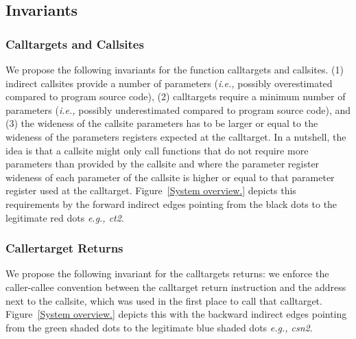 \subsection{Invariants}
\label{Invariants for Targets and Callsites}

\subsubsection{Calltargets and Callsites}
We propose the following invariants for the function calltargets and callsites.
(1) indirect callsites provide a number of parameters (\textit{i.e.,} possibly overestimated compared to program source code), 
(2) calltargets require a minimum number of parameters (\textit{i.e.,} possibly underestimated compared to program source code), and
(3) the wideness of the callsite parameters has to be larger or equal to the wideness of the parameters registers expected at the calltarget.
In a nutshell, the idea is that a callsite might only call functions that do not require more parameters than provided by the callsite and
where the parameter register wideness of each parameter of the callsite is higher or equal to that parameter register used at the calltarget.
Figure~\ref{System overview.} depicts this requirements by the forward indirect edges pointing from the black dots to the legitimate
red dots \textit{e.g., ct2}.

\subsubsection{Callertarget Returns}
We propose the following invariant for the calltargets returns:
we enforce the caller-callee convention between the calltarget return instruction and the address next 
to the callsite, which was used in the first place to call that calltarget.
Figure~\ref{System overview.} depicts this with the backward indirect edges pointing from the green shaded dots to the legitimate
blue shaded dots \textit{e.g., csn2}.

